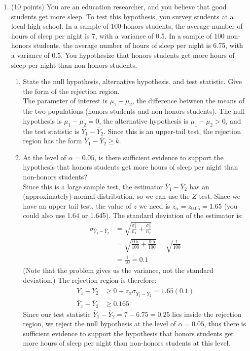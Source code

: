 \documentclass[12pt]{article}
\begin{document}
\title{}
\author{\vspace{-10ex} }


\begin{enumerate}

\item (10 points) You are an education researcher, and you believe that good students get more sleep. To test this hypothesis, you survey students at a local high school. In a sample of 100 honors students, the average number of hours of sleep per night is 7, with a variance of 0.5. In a sample of 100 non-honors students, the average number of hours of sleep per night is 6.75, with a variance of 0.5. You hypothesize that honors students get more hours of sleep per night than non-honors students.
\begin{enumerate}
\item State the null hypothesis, alternative hypothesis, and test statistic. Give the form of the rejection region.\\

The parameter of interest is $\mu_1 - \mu_2$, the difference between the means of the two populations (honors students and non-honors students). The null hypothesis is $\mu_1 - \mu_2 = 0$, the alternative hypothesis is $\mu_1 - \mu_2 > 0$, and the test statistic is $\bar{Y}_1 - \bar{Y}_2$. Since this is an upper-tail test, the rejection region has the form $\bar{Y}_1 - \bar{Y}_2 \geq k$.

\item At the level of $\alpha = 0.05$, is there sufficient evidence to support the hypothesis that honors students get more hours of sleep per night than non-honors students? \\

Since this is a large sample test, the estimator $\bar{Y}_1 - \bar{Y}_2$ has an (approximately) normal distribution, so we can use the $Z$-test. Since we have an upper tail test, the value of $z$ we need is $z_{\alpha} = z_{0.05} = 1.65$ (you could also use 1.64 or 1.645). The standard deviation of the estimator is:
\begin{align*}
\sigma_{\bar{Y}_1 - \bar{Y}_2} &= \sqrt{ \frac{\sigma_1^2}{n_1} + \frac{\sigma_2^2}{n_2} } \\
&= \sqrt{ \frac{0.5}{100} + \frac{0.5}{100} } = \sqrt{ \frac{1}{100} } \\
&= \frac{1}{10} = 0.1
\end{align*}
(Note that the problem gives us the variance, not the standard deviation.) The rejection region is therefore:
\begin{align*}
\bar{Y}_1 - \bar{Y}_2 &\geq 0 + z_\alpha \sigma_{\bar{Y}_1 - \bar{Y}_2} = 1.65 (0.1) \\
\bar{Y}_1 - \bar{Y}_2 &\geq 0.165
\end{align*}
Since our test statistic $\bar{Y}_1 - \bar{Y}_2 = 7 - 6.75 = 0.25$ lies inside the rejection region, we reject the null hypothesis at the level of $\alpha = 0.05$, thus there is sufficient evidence to support the hypothesis that honors students get more hours of sleep per night than non-honors students at this level.


\end{enumerate}
\end{enumerate}
\end{document}
